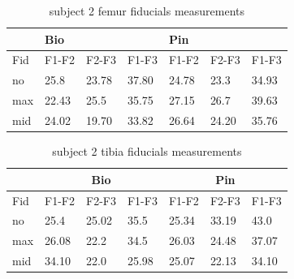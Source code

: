 \begin{table}[]
\centering
\begin{tabular}{ll|lll|lll|}
\cline{3-8}
            &             & \multicolumn{3}{l|}{Bio}                                                    & \multicolumn{3}{l|}{Pin}                                                    \\ \hline
\multicolumn{2}{|l|}{Fid} & \multicolumn{1}{l|}{F1-F2} & \multicolumn{1}{l|}{F2-F3} & F1-F3 & \multicolumn{1}{l|}{F1-F2} & \multicolumn{1}{l|}{F2-F3} & F1-F3 \\ \hline
\multicolumn{2}{|l|}{no}  & \multicolumn{1}{l|}{25.8}      & \multicolumn{1}{l|}{23.78}     & 37.80     & \multicolumn{1}{l|}{24.78}     & \multicolumn{1}{l|}{23.3}      & 34.93     \\ \hline
\multicolumn{2}{|l|}{max} & \multicolumn{1}{l|}{22.43}     & \multicolumn{1}{l|}{25.5}      & 35.75     & \multicolumn{1}{l|}{27.15}     & \multicolumn{1}{l|}{26.7}      & 39.63     \\ \hline
\multicolumn{2}{|l|}{mid} & \multicolumn{1}{l|}{24.02}     & \multicolumn{1}{l|}{19.70}     & 33.82     & \multicolumn{1}{l|}{26.64}     & \multicolumn{1}{l|}{24.20}     & 35.76     \\ \hline
\end{tabular}
\caption{subject 2 femur fiducials measurements }
\label{tab:sub2_femur}
\end{table}

\begin{table}[]
\centering
\begin{tabular}{ll|lll|lll|}
\cline{3-8}
            &             & \multicolumn{3}{c|}{Bio}                                                    & \multicolumn{3}{c|}{Pin}                                                    \\ \hline
\multicolumn{2}{|l|}{Fid} & \multicolumn{1}{l|}{F1-F2} & \multicolumn{1}{l|}{F2-F3} & F1-F3 & \multicolumn{1}{l|}{F1-F2} & \multicolumn{1}{l|}{F2-F3} & F1-F3 \\ \hline
\multicolumn{2}{|l|}{no}  & \multicolumn{1}{l|}{25.4}      & \multicolumn{1}{l|}{25.02}     & 35.5      & \multicolumn{1}{l|}{25.34}     & \multicolumn{1}{l|}{33.19}     & 43.0      \\ \hline
\multicolumn{2}{|l|}{max} & \multicolumn{1}{l|}{26.08}     & \multicolumn{1}{l|}{22.2}      & 34.5      & \multicolumn{1}{l|}{26.03}     & \multicolumn{1}{l|}{24.48}     & 37.07     \\ \hline
\multicolumn{2}{|l|}{mid} & \multicolumn{1}{l|}{34.10}     & \multicolumn{1}{l|}{22.0}      & 25.98     & \multicolumn{1}{l|}{25.07}     & \multicolumn{1}{l|}{22.13}     & 34.10     \\ \hline
\end{tabular}
\caption{subject 2 tibia fiducials measurements }
\label{tab:sub2_tibia}
\end{table}






